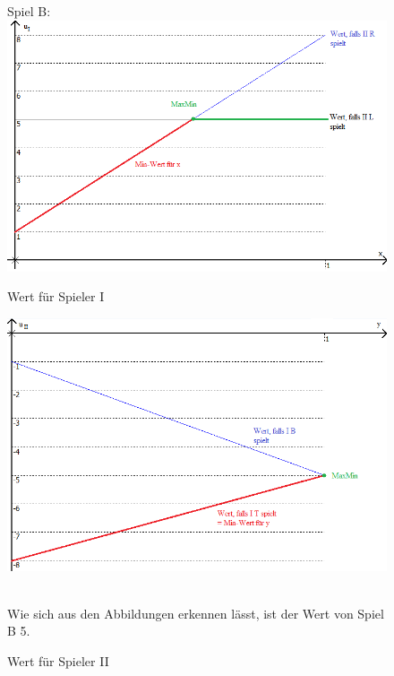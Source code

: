 \documentclass{scrartcl}
\begin{document}
\begin{figure}
Spiel B: \\

\includegraphics[width=1\textwidth]{2_maxMin_B1.png}
\caption{Wert für Spieler I}
\end{figure}
\begin{figure}
\includegraphics[width=1\textwidth]{2_maxMin_B2.png}
\caption{Wert für Spieler II}
\text{ }\\
Wie sich aus den Abbildungen erkennen lässt, ist der Wert von Spiel B 5.
\end{figure}
\end{document}
